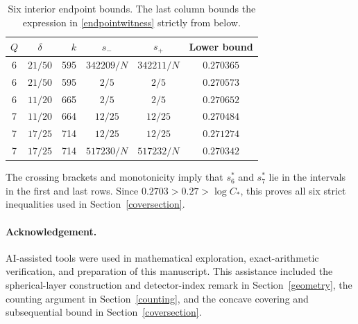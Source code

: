 \documentclass[12pt,a4paper]{article}
\begin{document}
\begin{table}[H]
\centering
\caption{Six interior endpoint bounds. The last column bounds the expression in \eqref{endpointwitness} strictly from below.}
\label{endpointtable}
\renewcommand{\arraystretch}{1.2}
\begin{tabular}{c c r c c c}
\toprule
$Q$ & $\delta$ & $k$ & $s_-$ & $s_+$ & Lower bound\\\midrule
6 & $21/50$ & 595 & $342209/N$ & $342211/N$ & $0.270365$\\
6 & $21/50$ & 595 & $2/5$ & $2/5$ & $0.270573$\\
6 & $11/20$ & 665 & $2/5$ & $2/5$ & $0.270652$\\
7 & $11/20$ & 664 & $12/25$ & $12/25$ & $0.270484$\\
7 & $17/25$ & 714 & $12/25$ & $12/25$ & $0.271274$\\
7 & $17/25$ & 714 & $517230/N$ & $517232/N$ & $0.270342$\\\bottomrule
\end{tabular}
\end{table}

The crossing brackets and monotonicity imply that $s_6^*$ and $s_7^*$ lie in the intervals in the first and last rows. Since $0.2703>0.27>\log C_*$, this proves all six strict inequalities used in Section~\ref{coversection}.

\paragraph{Acknowledgement.}
AI-assisted tools were used in mathematical exploration, exact-arithmetic verification, and preparation of this manuscript. This assistance included the spherical-layer construction and detector-index remark in Section~\ref{geometry}, the counting argument in Section~\ref{counting}, and the concave covering and subsequential bound in Section~\ref{coversection}.
\end{document}
